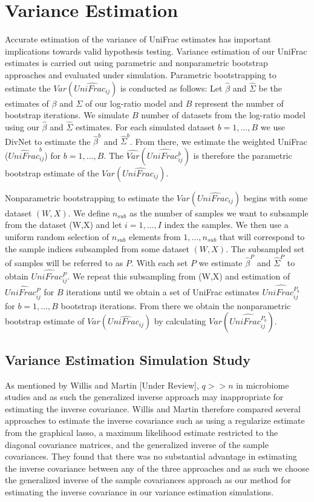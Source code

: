 \documentclass{article}
\newcommand*{\myfont}{\fontfamily{lmtt}\selectfont}
\begin{document}
\section{Variance Estimation}
Accurate estimation of the variance of UniFrac estimates has important implications towards valid hypothesis testing. Variance estimation of our UniFrac estimates is carried out using parametric and nonparametric bootstrap approaches and evaluated under simulation.
Parametric bootstrapping to estimate the $Var(\widehat{UniFrac_{ij}})$ is conducted as follows:
Let $\hat{\beta}$ and $\hat{\Sigma}$ be the estimates of $\beta$ and $\Sigma$ of our log-ratio model and $B$ represent the number of bootstrap iterations. We simulate $B$ number of datasets from the log-ratio model using our $\hat{\beta}$ and $\hat{\Sigma}$ estimates.  For each simulated dataset $b=1,...,B$ we use {\myfont DivNet} to estimate the $\hat{\beta}^{b}$ and $\hat{\Sigma}^{b}$. From there,  we estimate the weighted UniFrac ($\widehat{UniFrac}_{ij}^{b}$) for $b=1,...,B$. The $\widehat{Var}(\widehat{UniFrac_{ij}^{b}})$ is therefore the parametric bootstrap estimate of the $Var(\widehat{UniFrac_{ij}})$.

Nonparametric bootstrapping to estimate the $Var(\widehat{UniFrac_{ij}})$ begins with some dataset $(W,X)$. We define $n_{sub}$ as the number of samples we want to subsample from the dataset (W,X) and let $i = 1,...,I$ index the samples. We then use a uniform random selection of $n_{sub}$ elements from ${1,...,n_{sub}}$ that will correspond to the sample indices subsampled from some dataset $(W,X)$. The subsampled set of samples will be referred to as $P$. With each set $P$ we estimate $\hat{\beta}^{P}$ and $\hat{\Sigma}^{P}$ to obtain $\widehat{UniFrac_{ij}^{P}}$. We repeat this subsampling from (W,X) and estimation of $\widehat{UniFrac_{ij}^{P}}$ for $B$ iterations until we obtain a set of UniFrac estimates $\widehat{UniFrac_{ij}^{P_{b}}}$ for $b = 1,...,B$ bootstrap iterations. From there we obtain the nonparametric bootstrap estimate of $Var(\widehat{UniFrac_{ij}})$ by calculating $\widehat{Var}(\widehat{UniFrac_{ij}^{P_{b}}})$.

\subsection{Variance Estimation Simulation Study}
As mentioned by Willis and Martin [Under Review], $q>>n$ in microbiome studies and as such the generalized inverse approach may inappropriate for estimating the inverse covariance. Willis and Martin therefore compared several approaches to estimate the inverse covariance such as using a regularize estimate from the graphical lasso, a maximum likelihood estimate restricted to the diagonal covariance matrices, and the generalized inverse of the sample covariances. They found that there was no substantial advantage in estimating the inverse covariance between any of the three approaches and as such we choose the generalized inverse of the sample covariances approach as our method for estimating the inverse covariance in our variance estimation simulations.
\end{document}
